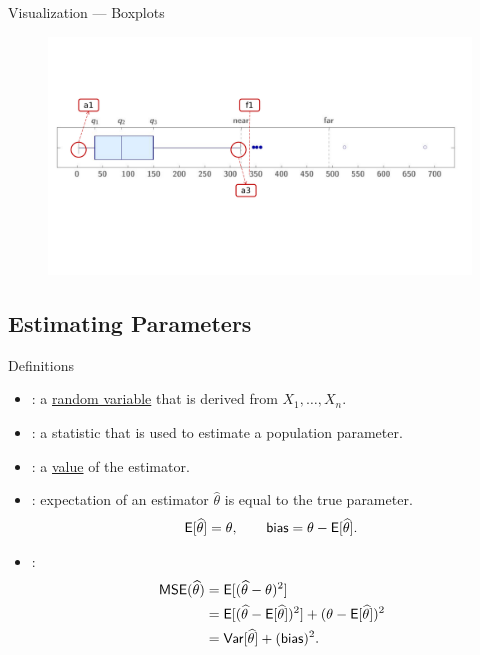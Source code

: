 \begin{frame}{Visualization --- Boxplots}

\begin{figure}[htbp]
	\centering
	\includegraphics[width=\linewidth]{./images/rc4fig2.pdf}
\end{figure}

\end{frame}


\subsection{Estimating Parameters}

\begin{frame}{Definitions}

\begin{itemize}
	\justifying
	\item {}: a \underline{random variable} that is derived from $X_1, \ldots, X_n$.
	\item {}: a statistic that is used to estimate a population parameter.
	\item {}: a \underline{value} of the estimator.
	\item {}: expectation of an estimator $\widehat{\theta}$ is equal to the true parameter.
	\begin{align*}
	\mathsf{E}[\widehat{\theta}] = \theta, \qquad \mathsf{bias} = \theta - \mathsf{E}[\widehat{\theta}].
	\end{align*}
	\item {}:
	\begin{align*}
	\mathsf{MSE}(\widehat{\theta}) & = \mathsf{E}[(\widehat{\theta} - \theta)^2] \\
	& = \mathsf{E}[(\widehat{\theta} - \mathsf{E}[\widehat{\theta}])^2] + (\theta - \mathsf{E}[\widehat{\theta}])^2 \\
	& = \mathsf{Var}[\widehat{\theta}] + (\mathsf{bias})^2.
	\end{align*}
\end{itemize}

\end{frame}


